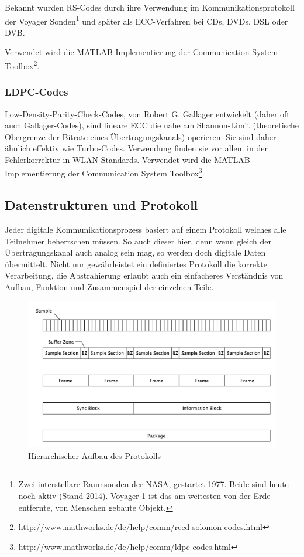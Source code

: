 Bekannt wurden RS-Codes durch ihre Verwendung im Kommunikationsprotokoll der Voyager Sonden\footnote{Zwei interstellare Raumsonden der NASA, gestartet 1977. Beide sind heute noch aktiv (Stand 2014). Voyager 1 ist das am weitesten von der Erde entfernte, von Menschen gebaute Objekt.} und später als ECC-Verfahren bei CDs, DVDs, DSL oder DVB. 

Verwendet wird die MATLAB Implementierung der Communication System Toolbox\footnote{\url{http://www.mathworks.de/de/help/comm/reed-solomon-codes.html}}.

\subsubsection{LDPC-Codes}

Low-Density-Parity-Check-Codes, von  Robert G. Gallager\cite{gallager1962low} entwickelt (daher oft auch Gallager-Codes), sind lineare ECC die nahe am Shannon-Limit (theoretische Obergrenze der Bitrate eines Übertragungskanals) operieren. Sie sind daher ähnlich effektiv wie Turbo-Codes. Verwendung finden sie vor allem in der Fehlerkorrektur in WLAN-Standards.
Verwendet wird die MATLAB Implementierung der Communication System Toolbox\footnote{\url{http://www.mathworks.de/de/help/comm/ldpc-codes.html}}.


\subsection{Datenstrukturen und Protokoll}
\label{sec:protokoll}

Jeder digitale Kommunikationsprozess basiert auf einem Protokoll welches alle Teilnehmer beherrschen müssen. So auch dieser hier, denn wenn gleich der Übertragungskanal auch analog sein mag, so werden doch digitale Daten übermittelt. Nicht nur gewährleistet ein definiertes Protokoll die korrekte Verarbeitung, die Abstrahierung erlaubt auch ein einfacheres Verständnis von Aufbau, Funktion und Zusammenspiel der einzelnen Teile. 

\begin{figure}[h]
	\centering
	\includegraphics[width=\textwidth]{figures/figures-protocol.pdf}
	\caption{Hierarchischer Aufbau des Protokolls}
	\label{fig:protocol}
\end{figure}

